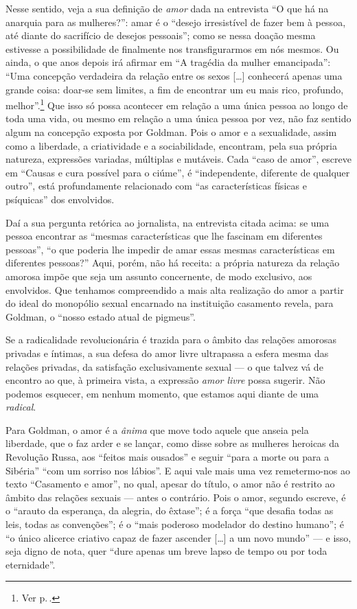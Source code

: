 Nesse sentido, veja a sua definição de \textit{amor}
dada na entrevista ``O que há na anarquia
para as mulheres?'': amar é o ``desejo irresistível de fazer bem à
pessoa, até diante do sacrifício de desejos pessoais''; como se nessa
doação mesma estivesse a possibilidade de finalmente nos transfigurarmos
em nós mesmos. Ou ainda, o que anos depois irá afirmar em ``A tragédia
da mulher emancipada'': ``Uma concepção verdadeira da relação entre os
sexos {[}\ldots{]} conhecerá apenas uma grande coisa: doar-se sem limites,
a fim de encontrar um eu mais rico, profundo, melhor''.\footnote{Ver p.\,\pageref{concepcao}.} Que isso só
possa acontecer em relação a uma única pessoa ao longo de toda uma
vida, ou mesmo em relação a uma única pessoa por vez, não faz sentido algum na
concepção exposta por Goldman. Pois o amor e a
sexualidade, assim como a liberdade, a criatividade e a sociabilidade,
encontram, pela sua própria natureza, expressões variadas, múltiplas e
mutáveis. Cada ``caso de amor'', escreve em ``Causas e cura possível
para o ciúme'', é ``independente, diferente de qualquer outro'', está
profundamente relacionado com ``as características físicas e psíquicas''
dos envolvidos.

Daí a sua pergunta retórica ao jornalista, na entrevista
citada acima: se uma pessoa encontrar as ``mesmas características que lhe
fascinam em diferentes pessoas'', ``o que poderia lhe impedir de amar
essas mesmas características em diferentes pessoas?'' Aqui, porém, não
há receita: a própria natureza da relação amorosa impõe que seja um
assunto concernente, de modo exclusivo, aos envolvidos. Que tenhamos
compreendido a mais alta realização do amor a partir do ideal do
monopólio sexual encarnado na instituição casamento revela, para
Goldman, o ``nosso estado atual de pigmeus''.

Se a radicalidade revolucionária é trazida para
o âmbito das relações amorosas privadas e íntimas, a sua
defesa do amor livre ultrapassa a esfera mesma das relações
privadas, da satisfação exclusivamente sexual --- o que talvez
vá de encontro ao que, à primeira vista, a expressão \textit{amor livre}
possa sugerir. Não podemos esquecer, em nenhum momento, que estamos aqui
diante de uma \textit{radical}.

Para Goldman, o amor é a \textit{ânima} que
move todo aquele que anseia pela liberdade, que o faz arder e se lançar,
como disse sobre as mulheres heroicas da Revolução Russa, aos ``feitos
mais ousados'' ​​e seguir ``para a morte ou para a Sibéria'' ``com um
sorriso nos lábios''. E aqui vale mais uma vez remetermo-nos ao texto
``Casamento e amor'', no qual, apesar do título, o amor não é
restrito ao âmbito das relações sexuais --- antes o contrário. Pois o
amor, segundo escreve, é o ``arauto da esperança, da alegria, do
êxtase''; é a força ``que desafia todas as leis, todas as
convenções''; é o ``mais poderoso modelador do destino humano'';
é ``o único alicerce criativo capaz de fazer ascender {[}\ldots{]} a um
novo mundo'' --- e isso, seja digno de nota, quer ``dure apenas um breve
lapso de tempo ou por toda eternidade''. 

